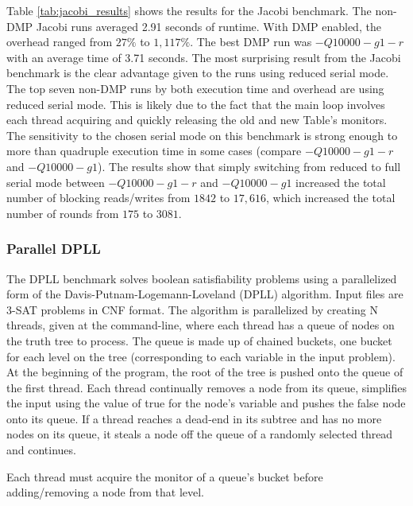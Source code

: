 Table \ref{tab:jacobi_results} shows the results for the Jacobi
benchmark.  The non-DMP Jacobi runs averaged 2.91 seconds of runtime.
With DMP enabled, the overhead ranged from $27\%$ to $1,117\%$.  The
best DMP run was $-Q10000 -g1 -r$ with an average time of 3.71
seconds.  The most surprising result from the Jacobi benchmark is the
clear advantage given to the runs using reduced serial mode.  The top
seven non-DMP runs by both execution time and overhead are using
reduced serial mode.  This is likely due to the fact that the main
loop involves each thread acquiring and quickly releasing the old and
new Table's monitors.  The sensitivity to the chosen serial mode on
this benchmark is strong enough to more than quadruple execution time
in some cases (compare $-Q10000 -g1 -r$ and $-Q10000 -g1$).  The
results show that simply switching from reduced to full serial mode
between $-Q10000 -g1 -r$ and $-Q10000 -g1$ increased the total number
of blocking reads/writes from $1842$ to $17,616$, which increased the
total number of rounds from $175$ to $3081$.

\subsubsection{Parallel DPLL}

The DPLL benchmark solves boolean satisfiability problems using a
parallelized form of the Davis-Putnam-Logemann-Loveland (DPLL)
algorithm.  Input files are 3-SAT problems in CNF format.  The
algorithm is parallelized by creating N threads, given at the
command-line, where each thread has a queue of nodes on the truth tree
to process.  The queue is made up of chained buckets, one bucket for
each level on the tree (corresponding to each variable in the input
problem).  At the beginning of the program, the root of the tree is
pushed onto the queue of the first thread.  Each thread continually
removes a node from its queue, simplifies the input using the value of
true for the node's variable and pushes the false node onto its queue.
If a thread reaches a dead-end in its subtree and has no more nodes on
its queue, it steals a node off the queue of a randomly selected
thread and continues.

Each thread must acquire the monitor of a queue's bucket before
adding/removing a node from that level.

